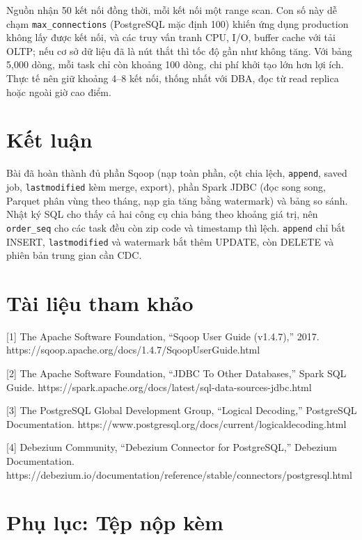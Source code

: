 \documentclass[
  12pt,
  a4paper,
]{report}
\begin{document}
Nguồn nhận 50 kết nối đồng thời, mỗi kết nối một range scan. Con số này
dễ chạm \texttt{max\_connections} (PostgreSQL mặc định 100) khiến ứng
dụng production không lấy được kết nối, và các truy vấn tranh CPU, I/O,
buffer cache với tải OLTP; nếu cơ sở dữ liệu đã là nút thắt thì tốc độ
gần như không tăng. Với bảng 5,000 dòng, mỗi task chỉ còn khoảng 100
dòng, chi phí khởi tạo lớn hơn lợi ích. Thực tế nên giữ khoảng 4--8 kết
nối, thống nhất với DBA, đọc từ read replica hoặc ngoài giờ cao điểm.

\section{Kết luận}\label{sec:l04-conclusion}

Bài đã hoàn thành đủ phần Sqoop (nạp toàn phần, cột chia lệch,
\texttt{append}, saved job, \texttt{lastmodified} kèm merge, export),
phần Spark JDBC (đọc song song, Parquet phân vùng theo tháng, nạp gia
tăng bằng watermark) và bảng so sánh. Nhật ký SQL cho thấy cả hai công
cụ chia bảng theo khoảng giá trị, nên \texttt{order\_seq} cho các task
đều còn zip code và timestamp thì lệch. \texttt{append} chỉ bắt INSERT,
\texttt{lastmodified} và watermark bắt thêm UPDATE, còn DELETE và phiên
bản trung gian cần CDC.

\section*{Tài liệu tham khảo}\label{tuxe0i-liux1ec7u-tham-khux1ea3o-3}

{[}1{]} The Apache Software Foundation, ``Sqoop User Guide (v1.4.7),''
2017. https://sqoop.apache.org/docs/1.4.7/SqoopUserGuide.html

{[}2{]} The Apache Software Foundation, ``JDBC To Other Databases,''
Spark SQL Guide.
https://spark.apache.org/docs/latest/sql-data-sources-jdbc.html

{[}3{]} The PostgreSQL Global Development Group, ``Logical Decoding,''
PostgreSQL Documentation.
https://www.postgresql.org/docs/current/logicaldecoding.html

{[}4{]} Debezium Community, ``Debezium Connector for PostgreSQL,''
Debezium Documentation.
https://debezium.io/documentation/reference/stable/connectors/postgresql.html

\section*{Phụ lục: Tệp nộp
kèm}\label{phux1ee5-lux1ee5c-tux1ec7p-nux1ed9p-kuxe8m}
\end{document}
